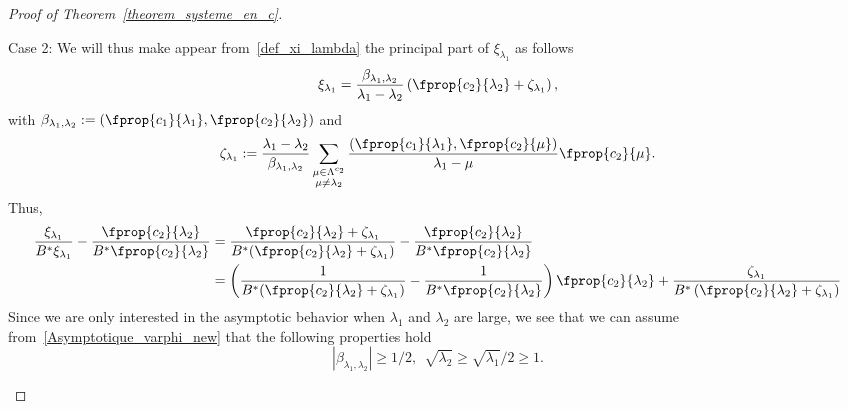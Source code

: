 \begin{proof}[Proof of Theorem~\ref{theorem_systeme_en_c}]
\begin{step}{Case 2:}
We will thus make appear from~\eqref{def_xi_lambda} the principal part of $\xi_{\lambda_1}$ as follows
\[
\xi_{\lambda_1} = \frac{\beta_{\lambda_1,\lambda_2}}{\lambda_1-\lambda_2} \left(\fprop{c_2}{\lambda_2} + \zeta_{\lambda_1}\right),
\]
with $\beta_{\lambda_1,\lambda_2} := (\fprop{c_1}{\lambda_1},\fprop{c_2}{\lambda_2})$ and
\[
\zeta_{\lambda_1} := \frac{\lambda_1-\lambda_2}{\beta_{\lambda_1,\lambda_2}} \sum_{\substack{\mu\in \Lambda^{c_2}\\ \mu\neq\lambda_2}} \frac{\left(\fprop{c_1}{\lambda_1},\fprop{c_2}{\mu}\right)}{\lambda_1-\mu} \fprop{c_2}{\mu}.
\]
Thus,
\begin{equation}\label{MiseEnValeurCompensation}
\begin{aligned}
\frac{\xi_{\lambda_1}}{B^* \xi_{\lambda_1}} - \frac{\fprop{c_2}{\lambda_2}}{B^* \fprop{c_2}{\lambda_2}} &=
\frac{\fprop{c_2}{\lambda_2}+\zeta_{\lambda_1}}{B^*(\fprop{c_2}{\lambda_2}+\zeta_{\lambda_1}) } - \frac{\fprop{c_2}{\lambda_2}}{B^* \fprop{c_2}{\lambda_2}}
\\
&= \left(\frac{1}{B^* (\fprop{c_2}{\lambda_2}+\zeta_{\lambda_1})} - \frac{1}{B^* \fprop{c_2}{\lambda_2}} \right) \fprop{c_2}{\lambda_2} + \frac{\zeta_{\lambda_1}}{B^* \left(\fprop{c_2}{\lambda_2}+\zeta_{\lambda_1}\right)}
\end{aligned}
\end{equation}
Since we are only interested in the asymptotic behavior when $\lambda_1$ and $\lambda_2$ are large, we see that we can assume from~\eqref{Asymptotique_varphi_new} that the following properties hold
\begin{equation}\label{lambda_est_grand}
|\beta_{\lambda_1,\lambda_2}| \geq 1/2, \ \ \sqrt{\lambda_2}\geq \sqrt{\lambda_1}/2\geq 1.
\end{equation}


\end{step}
\end{proof}
